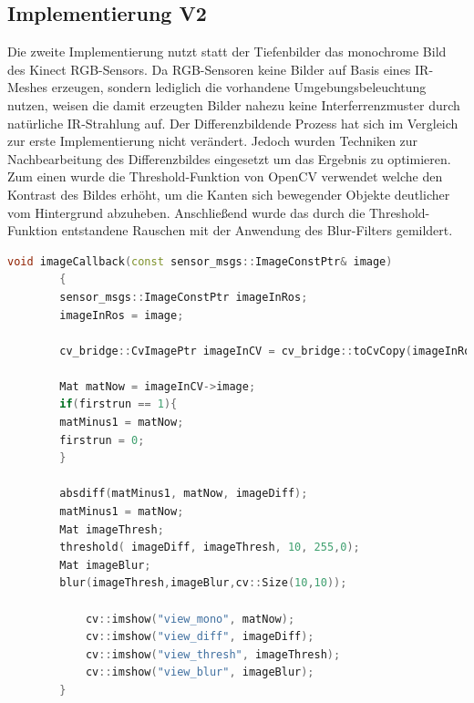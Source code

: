 		\subsection{Implementierung V2}
		Die zweite Implementierung nutzt statt der Tiefenbilder das monochrome Bild des Kinect RGB-Sensors. Da RGB-Sensoren keine Bilder auf Basis eines IR-Meshes erzeugen, sondern lediglich die vorhandene Umgebungsbeleuchtung nutzen, weisen die damit erzeugten Bilder nahezu keine Interferrenzmuster durch natürliche IR-Strahlung auf. Der Differenzbildende Prozess hat sich im Vergleich zur erste Implementierung nicht verändert. Jedoch wurden Techniken zur Nachbearbeitung des Differenzbildes eingesetzt um das Ergebnis zu optimieren. Zum einen wurde die Threshold-Funktion von OpenCV verwendet welche den Kontrast des Bildes erhöht, um die Kanten sich bewegender Objekte deutlicher vom Hintergrund abzuheben. Anschließend wurde das durch die Threshold-Funktion entstandene Rauschen mit der Anwendung des Blur-Filters gemildert.\\

		\newpage
		\begin{lstlisting}[caption=imageCallbackV2 Funktion des Objekt-Erkennungs nodes, label=imageCallback-V2, title=imageCallback-V2, language=C++]
		void imageCallback(const sensor_msgs::ImageConstPtr& image)
		{
		sensor_msgs::ImageConstPtr imageInRos;
		imageInRos = image;
		
		cv_bridge::CvImagePtr imageInCV = cv_bridge::toCvCopy(imageInRos);
		
		Mat matNow = imageInCV->image;
		if(firstrun == 1){
		matMinus1 = matNow;
		firstrun = 0;
		}
		
		absdiff(matMinus1, matNow, imageDiff);
		matMinus1 = matNow;
		Mat imageThresh;
		threshold( imageDiff, imageThresh, 10, 255,0);
		Mat imageBlur;
		blur(imageThresh,imageBlur,cv::Size(10,10));
		
		    cv::imshow("view_mono", matNow);
		    cv::imshow("view_diff", imageDiff);
		    cv::imshow("view_thresh", imageThresh);
		    cv::imshow("view_blur", imageBlur);
		}
		\end{lstlisting}
		
